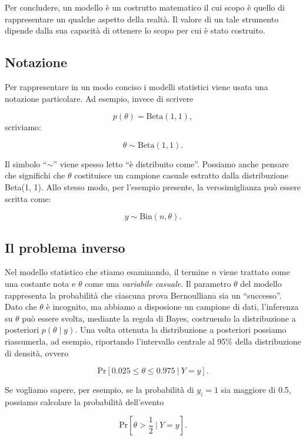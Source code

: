 \documentclass[
]{memoir}
\theoremstyle{definition}
\theoremstyle{definition}
\theoremstyle{definition}
\theoremstyle{definition}
\theoremstyle{remark}
\begin{document}
Per concludere, un modello è un costrutto matematico il cui scopo è quello di rappresentare un qualche aspetto della realtà. Il valore di un tale strumento dipende dalla sua capacità di ottenere lo scopo per cui è stato costruito.

\hypertarget{notazione}{%
\subsection{Notazione}\label{notazione}}

Per rappresentare in un modo conciso i modelli statistici viene usata una notazione particolare. Ad esempio, invece di scrivere

\[
p(\theta) = \text{Beta}(1, 1),
\]
\noindent
scriviamo:

\[
\theta \sim \text{Beta}(1, 1).
\]

Il simbolo ``\(\sim\)'' viene spesso letto ``è distribuito come''. Possiamo anche pensare che significhi che \(\theta\) costituisce un campione casuale estratto dalla distribuzione Beta(1, 1). Allo stesso modo, per l'esempio presente, la verosimiglianza può essere scritta come:

\[
y \sim \text{Bin}(n, \theta).
\]

\hypertarget{il-problema-inverso}{%
\subsection{Il problema inverso}\label{il-problema-inverso}}

Nel modello statistico che stiamo esaminando, il termine \(n\) viene trattato come una costante nota e \(\theta\) come una \emph{variabile casuale}. Il parametro \(\theta\) del modello rappresenta la probabilità che ciascuna prova Bernoulliana sia un ``successo''. Dato che \(\theta\) è incognito, ma abbiamo a disposione un campione di dati, l'inferenza su \(\theta\) può essere svolta, mediante la regola di Bayes, costruendo la distribuzione a posteriori \(p(\theta \mid y)\). Una volta ottenuta la distribuzione a posteriori possiamo riassumerla, ad esempio, riportando l'intervallo centrale al 95\% della distribuzione di densità, ovvero

\[
\mbox{Pr}\left[ 0.025 \leq \theta \leq 0.975
                \ \Big| \
        Y = y
         \right].
\]

Se vogliamo sapere, per esempio, se la probabilità di \(y_i=1\) sia maggiore di 0.5, possiamo calcolare la probabilità dell'evento

\[
\mbox{Pr}\left[\theta > \frac{1}{2}
                \ \Bigg| \
        Y = y
         \right].
\]
\end{document}
